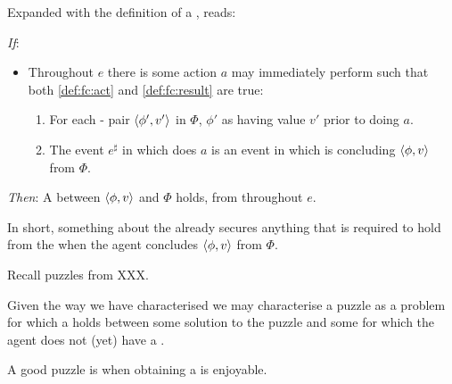\begin{note}
  \noindent%
  Expanded with the definition of a \fc{}, \supportII{} reads:
  \begin{itenum}
  \item[\emph{If}:]
    \begin{itemize}
    \item
      Throughout \(e\) there is some action \(a\) \vAgent{} may immediately perform such that both \ref{def:fc:act} and \ref{def:fc:result} are true:
      \begin{enumerate}[label=\alph*., ref=(\alph*)]
      \item
        For each - pair \(\langle \phi', v' \rangle\) in \(\Phi\), \vAgent{} \evals{} \(\phi'\) as having value \(v'\) prior to doing \(a\).

      \item
        The event \(e^{\sharp}\) in which \vAgent{} does \(a\) is an event in which \vAgent{} is concluding \(\langle \phi, v \rangle\) from \(\Phi\).
      \end{enumerate}
    \end{itemize}
  \item[\emph{Then}:]
    A \ros{} between \(\langle \phi, v \rangle\) and \(\Phi\) holds, from  throughout \(e\).
  \end{itenum}

  \noindent%
  In short, something about the  already secures anything that is required to hold from the \agpe{} when the agent concludes \(\langle \phi, v \rangle\) from \(\Phi\).
\end{note}


\begin{note}
  Recall puzzles from XXX.

  Given the way we have characterised \ros{} we may characterise a puzzle as a problem for which a \ros{} holds between some solution to the puzzle and some \pool{} for which the agent does not (yet) have a \wit{}.

  A good puzzle is when obtaining a \wit{} is enjoyable.
\end{note}


